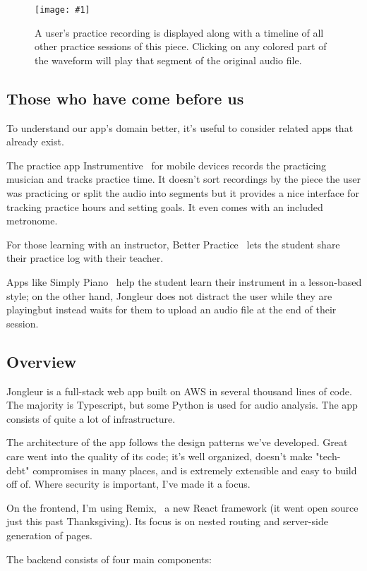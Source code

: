 \documentclass{article}
\newcommand{\screenshot}[2]{
  \begin{figure}[h]
    \texttt{[image: \#1]}
    \caption*{#2}
  \end{figure}
}
\begin{document}
\screenshot{jong-practice}{A user's practice recording is displayed along with a timeline of all other practice sessions of this piece. Clicking on any colored part of the waveform will play that segment of the original audio file.}

\subsection{Those who have come before us}

To understand our app's domain better, it's useful to consider related apps that already exist.

The practice app Instrumentive~\cite{instrumentive} for mobile devices records the practicing musician and tracks practice time.
It doesn't sort recordings by the piece the user was practicing or split the audio into segments but it provides a nice interface for tracking practice hours and setting goals.
It even comes with an included metronome.

For those learning with an instructor, Better Practice~\cite{better-practice} lets the student share their practice log with their teacher.

Apps like Simply Piano~\cite{simply-piano} help the student learn their instrument in a lesson-based style; on the other hand, Jongleur does not distract the user while they are playingbut instead waits for them to upload an audio file at the end of their session.

\subsection{Overview}
Jongleur is a full-stack web app built on AWS in several thousand lines of code.
The majority is Typescript, but some Python is used for audio analysis.
The app consists of quite a lot of infrastructure.

The architecture of the app follows the design patterns we've developed.
Great care went into the quality of its code; it's well organized, doesn't make "tech-debt" compromises in many places, and is extremely extensible and easy to build off of.
Where security is important, I've made it a focus.

On the frontend, I'm using Remix,~\cite{remix} a new React framework (it went open source just this past Thanksgiving).
Its focus is on nested routing and server-side generation of pages.

The backend consists of four main components:
\end{document}
